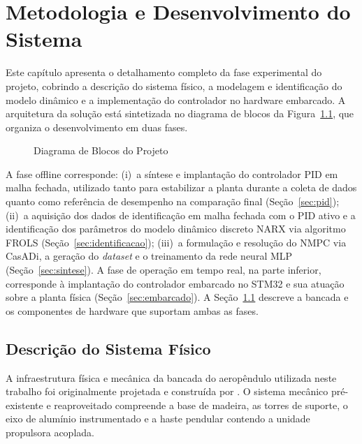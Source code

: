 \chapter{Metodologia e Desenvolvimento do Sistema}
\label{cap:metodologia}
 
Este capítulo apresenta o detalhamento completo da fase experimental do projeto, cobrindo a descrição do sistema físico, a modelagem e identificação do modelo dinâmico e a implementação do controlador no hardware embarcado. A arquitetura da solução está sintetizada no diagrama de blocos da Figura~\ref{fig:diagrama-blocos-projeto}, que organiza o desenvolvimento em duas fases.
 
\begin{figure}[H]
    \centering
    \caption{Diagrama de Blocos do Projeto}
    \label{fig:diagrama-blocos-projeto}
    
\end{figure}

 A fase offline corresponde: (i)~a síntese e implantação do controlador PID em malha fechada, utilizado tanto para estabilizar a planta durante a coleta de dados quanto como referência de desempenho na comparação final (Seção~\ref{sec:pid}); (ii)~a aquisição dos dados de identificação em malha fechada com o PID ativo e a identificação dos parâmetros do modelo dinâmico discreto NARX via algoritmo FROLS (Seção~\ref{sec:identificacao}); (iii)~a formulação e resolução do NMPC via CasADi, a geração do \textit{dataset} e o treinamento da rede neural MLP (Seção~\ref{sec:sintese}). A fase de operação em tempo real, na parte inferior, corresponde à implantação do controlador embarcado no STM32 e sua atuação sobre a planta física (Seção~\ref{sec:embarcado}). A Seção~\ref{sec:descricao_fisica} descreve a bancada e os componentes de hardware que suportam ambas as fases.
 
\section{Descrição do Sistema Físico}
\label{sec:descricao_fisica}
A infraestrutura física e mecânica da bancada do aeropêndulo utilizada neste trabalho foi originalmente projetada e construída por . O sistema mecânico pré-existente e reaproveitado compreende a base de madeira, as torres de suporte, o eixo de alumínio instrumentado e a haste pendular contendo a unidade propulsora acoplada.

